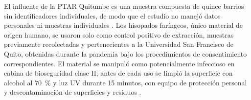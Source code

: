 El influente de la PTAR Quitumbe es una muestra compuesta de quince barrios sin identificadores individuales, de modo que el estudio no manejó datos personales ni muestras individuales \cite{Subedi_2019}. Los hisopados faríngeos, único material de origen humano, se usaron solo como control positivo de extracción, muestras previamente recolectadas y pertenecientes a la Universidad San Francisco de Quito, obtenidas durante la pandemia bajo los procedimientos de consentimiento correspondientes. El material se manipuló como potencialmente infeccioso en cabina de bioseguridad clase II; antes de cada uso se limpió la superficie con alcohol al 70~\% y luz UV durante 15 minutos, con equipo de protección personal y descontaminación de superficies y residuos \cite{WHO_2020}.
